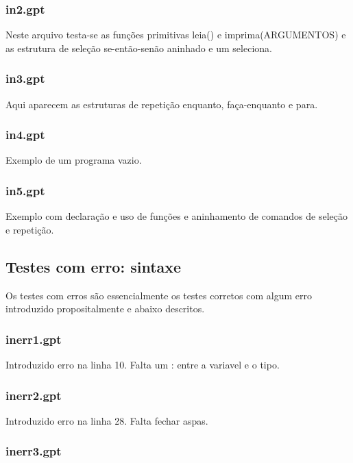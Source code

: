 \documentclass[a4paper,12pt]{report}
\begin{document}
\subsubsection{in2.gpt}

Neste arquivo testa-se as fun\c{c}\~oes primitivas leia() e imprima(ARGUMENTOS) e as estrutura 
de sele\c{c}\~ao se-ent\~ao-sen\~ao aninhado e um seleciona.

\subsubsection{in3.gpt}

Aqui aparecem as estruturas de repeti\c{c}\~ao enquanto, fa\c{c}a-enquanto e para.

\subsubsection{in4.gpt}

Exemplo de um programa vazio.

\subsubsection{in5.gpt}

Exemplo com declara\c{c}\~ao e uso de fun\c{c}\~oes e aninhamento de comandos de 
sele\c{c}\~ao e repeti\c{c}\~ao.


\subsection{Testes com erro: sintaxe}

Os testes com erros s\~ao essencialmente os testes corretos com algum erro 
introduzido propositalmente
e abaixo descritos.

\subsubsection{inerr1.gpt}

Introduzido erro na linha 10. Falta um : entre a variavel e o tipo.

\subsubsection{inerr2.gpt}

Introduzido erro na linha 28. Falta fechar aspas.

\subsubsection{inerr3.gpt}
\end{document}
